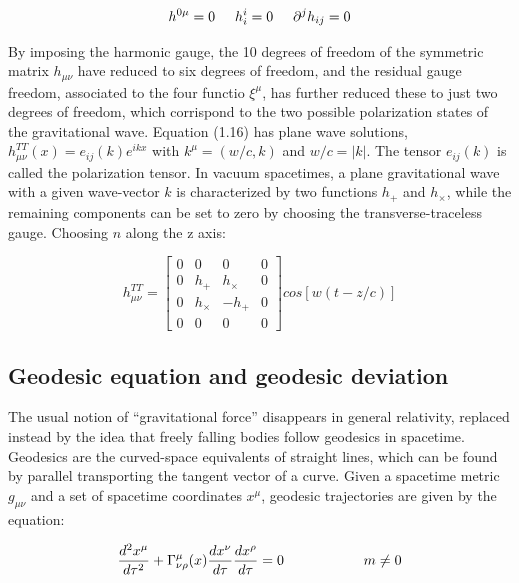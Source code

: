 \documentclass[binding=0.6cm, LaM]{sapthesis}
\begin{document}
		\begin{equation}
		h^{0\mu} = 0 \hspace*{0.5cm}  h^{i}_i = 0  \hspace*{0.5cm}   {\partial}^jh_{ij} = 0
		\end{equation}

	By imposing the harmonic gauge, the 10 degrees of freedom of the symmetric matrix $h_{\mu\nu}$ 
	have reduced to six degrees of freedom, and the residual gauge freedom,
	associated to the four functio $\xi^{\mu}$, has further reduced these to just two degrees of freedom, 
	which corrispond to the two possible polarization states of the gravitational wave.
	Equation (1.16) has plane wave solutions, $h_{\mu\nu}^{TT}(x)=e_{ij}(k)e^{ikx}$ with 
	$k^{\mu}=(w/c,k)$ and $w/c=|k|$. The tensor $e_{ij}(k)$ is called the polarization tensor.
	In vacuum spacetimes, a plane gravitational wave with a given wave-vector $k$ is characterized 
	by two functions $h_+$ and $h_{\times}$, while the remaining components can be set to zero by
	choosing the transverse-traceless gauge. Choosing $n$ along the z axis:

		\begin{equation} 
		h_{\mu\nu}^{TT} = 
		\begin{bmatrix}
		0 & 0 & 0 & 0 \\
		0 & h_{+} & h_{\times} & 0 \\
		0 & h_{\times} & -h_{+} & 0 \\
		0 & 0 & 0 & 0 
		\end{bmatrix}cos[w(t-z/c)]
		\end{equation}

\subsection{Geodesic equation and geodesic deviation}

	The usual notion of “gravitational force” disappears in general relativity, replaced instead 
	by the idea that freely falling bodies follow geodesics in spacetime.
	Geodesics are the curved-space equivalents of straight lines, which can be found by 
	parallel transporting the tangent vector of a curve.
	Given a spacetime metric $g_{\mu\nu}$ and a set of spacetime coordinates $x^{\mu}$, 
	geodesic trajectories are given by the equation:

		\begin{equation}
		{{d^2x^{\mu}}\over{d\tau^2}} + \Gamma_{\nu\rho}^{\mu}(x){{dx^{\nu}}\over{d\tau}}{{dx^{\rho}}\over{d\tau}} = 0 \hspace*{2cm} m \neq 0
		\end{equation}
\end{document}
